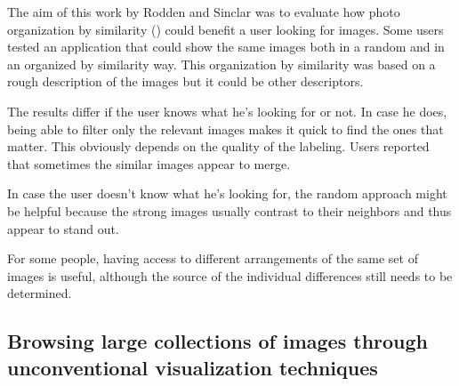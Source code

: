 The aim of this work by Rodden and Sinclar \cite{Rodden:2001p731} was to evaluate how photo organization by similarity () could benefit a user looking for images. Some users tested an application that could show the same images both in a random and in an organized by similarity way. This organization by similarity was based on a rough description of the images but it could be other descriptors.

The results differ if the user knows what he's looking for or not. In case he does, being able to filter only the relevant images makes it quick to find the ones that matter. This obviously depends on the quality of the labeling. Users reported that sometimes the similar images appear to merge.

In case the user doesn't know what he's looking for, the random approach might be helpful because the strong images usually contrast to their neighbors and thus appear to stand out.

For some people, having access to different arrangements of the same set of images is useful, although the source of the individual differences still needs to be determined.



\subsection{Browsing large collections of images through unconventional visualization techniques} %
\label{sub:Porta}

